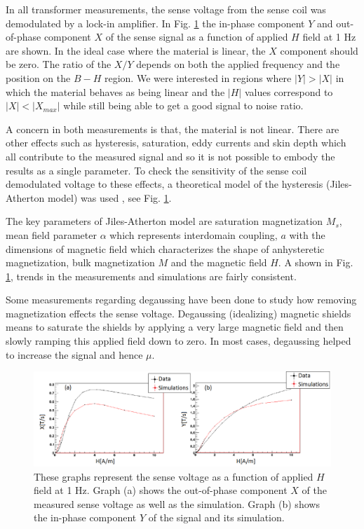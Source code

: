 \documentclass[review]{elsarticle}
\begin{document}
In all transformer measurements, the sense voltage from the sense coil was demodulated by a lock-in amplifier. In Fig. \ref{fig:data_and_simulation} the in-phase component $Y$ and out-of-phase component $X$ of the sense signal as a function of applied $H$ field at 1 Hz are shown. In the ideal case where the material is linear, the $X$ component should be zero. The ratio of the $X/Y$ depends on both the applied frequency and the position on the $B-H$ region. We were interested in regions where $\vert Y \vert > \vert X \vert $ in which the material behaves as being linear and the $\vert H \vert $ values correspond to $\vert X \vert < \vert X_{max} \vert$ while still being able to get a good signal to noise ratio.


A concern in both measurements is that, the material is not linear. There are other effects such as hysteresis, saturation, eddy currents and skin depth which all contribute to the measured signal and so it is not possible to embody the results as a single parameter. 
To check the sensitivity of the sense coil demodulated voltage to these effects, a theoretical model of the hysteresis (Jiles-Atherton model) was used \cite{bib:jiles}, see Fig.  \ref{fig:data_and_simulation}. 

The key parameters of Jiles-Atherton model \cite{jiles1994frequency} are saturation magnetization $M_s$, mean field parameter $\alpha$ which represents interdomain coupling, $a$ with the dimensions of magnetic field which characterizes the shape of anhysteretic magnetization, bulk magnetization $M$ and the magnetic field $H$. A shown in Fig. \ref{fig:data_and_simulation}, trends in the measurements and simulations are fairly consistent.

Some measurements regarding degaussing have been done to study how removing magnetization effects the sense voltage. Degaussing (idealizing) magnetic shields means to saturate the shields by applying a very large magnetic field and then slowly ramping this applied field down to zero. In most cases, degaussing helped to increase the signal and hence $\mu$.

\begin{figure}[h!]
\begin{center}
   \includegraphics[width=1.01\textwidth]{data_and_simulation3.PNG}
    \caption{These graphs represent the sense voltage as a function of applied $H$ field at 1 Hz. Graph (a) shows the out-of-phase component $X$ of the measured sense voltage as well as the simulation. Graph (b) shows the in-phase component $Y$ of the signal and its simulation.}
    \label{fig:data_and_simulation}
     \vspace{-2.em}
    \end{center}
\end{figure} 
\end{document}

